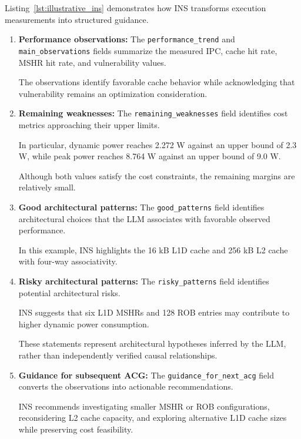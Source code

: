Listing~\ref{lst:illustrative_ins}
demonstrates how INS transforms execution
measurements into structured guidance.

\begin{enumerate}

\item \textbf{Performance observations:}
The \texttt{performance\_trend} and
\texttt{main\_observations} fields summarize
the measured IPC, cache hit rate, MSHR hit
rate, and vulnerability values.

The observations identify favorable cache
behavior while acknowledging that
vulnerability remains an optimization
consideration.

\item \textbf{Remaining weaknesses:}
The \texttt{remaining\_weaknesses} field
identifies cost metrics approaching their
upper limits.

In particular, dynamic power reaches
2.272 W against an upper bound of 2.3 W,
while peak power reaches 8.764 W against
an upper bound of 9.0 W.

Although both values satisfy the cost
constraints, the remaining margins
are relatively small.

\item \textbf{Good architectural patterns:}
The \texttt{good\_patterns} field identifies
architectural choices that the LLM
associates with favorable observed
performance.

In this example, INS highlights the
16 kB L1D cache and 256 kB L2 cache
with four-way associativity.

\item \textbf{Risky architectural patterns:}
The \texttt{risky\_patterns} field identifies
potential architectural risks.

INS suggests that six L1D MSHRs and
128 ROB entries may contribute to
higher dynamic power consumption.

These statements represent architectural
hypotheses inferred by the LLM, rather
than independently verified causal
relationships.

\item \textbf{Guidance for subsequent ACG:}
The \texttt{guidance\_for\_next\_acg}
field converts the observations into
actionable recommendations.

INS recommends investigating smaller
MSHR or ROB configurations, reconsidering
L2 cache capacity, and exploring
alternative L1D cache sizes while
preserving cost feasibility.

\end{enumerate}

